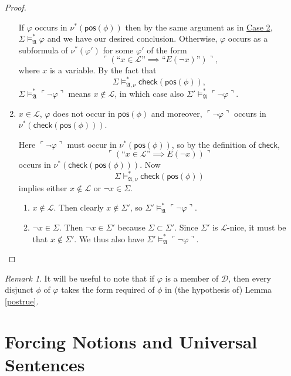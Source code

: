 \documentclass[12pt, twoside]{memoir}
\numberwithin{equation}{section}
\theoremstyle{definition}
\theoremstyle{remark}
\newtheorem{rem}[thm]{Remark}
\theoremstyle{definition}
\theoremstyle{definition}
\theoremstyle{definition}
\theoremstyle{remark}
\begin{document}
\begin{proof}
\begin{enumerate}[label=Case \arabic*:, leftmargin=50pt]
    If $\varphi$ occurs in $\nu^*(\mathsf{pos}(\phi))$ then by the same argument as in \hyperref[5136c2]{Case 2}, $\Sigma \models^*_{\mathfrak{A}} \varphi$ and we have our desired conclusion. Otherwise, $\varphi$ occurs as a subformula of $\nu^*(\varphi')$ for some $\varphi'$ of the form $$\ulcorner (\text{``} x \in \mathcal{L} \text{''} \implies \text{``} E(\neg x) \text{''}) \urcorner \text{,}$$ where $x$ is a variable. By the fact that $$\Sigma \models^*_{\mathfrak{A}, \nu} \mathsf{check}(\mathsf{pos}(\phi)),$$ $\Sigma \models^*_{\mathfrak{A}} \ulcorner \neg \varphi \urcorner$ means $x \not \in \mathcal{L}$, in which case also $\Sigma' \models^*_{\mathfrak{A}} \ulcorner \neg \varphi \urcorner$.
    \item $x \in \mathcal{L}$, $\varphi$ does not occur in $\mathsf{pos}(\phi)$ and moreover, $\ulcorner \neg \varphi \urcorner$ occurs in \\ $\nu^*(\mathsf{check}(\mathsf{pos}(\phi)))$. 
    
    Here $\ulcorner \neg \varphi \urcorner$ must occur in $\nu^*(\mathsf{pos}(\phi))$, so by the definition of $\mathsf{check}$, $$\ulcorner (\text{``} x \in \mathcal{L} \text{''} \implies E(\neg x)) \urcorner$$ occurs in $\nu^*(\mathsf{check}(\mathsf{pos}(\phi)))$. Now $$\Sigma \models^*_{\mathfrak{A}, \nu} \mathsf{check}(\mathsf{pos}(\phi))$$ implies either $x \not \in \mathcal{L}$ or $\neg x \in \Sigma$. 
    \begin{enumerate}[label=Subcase \arabic*:, leftmargin=60pt]
        \item $x \not \in \mathcal{L}$. Then clearly $x \not \in \Sigma'$, so $\Sigma' \models^*_{\mathfrak{A}} \ulcorner \neg \varphi \urcorner$.
        \item $\neg x \in \Sigma$. Then $\neg x \in \Sigma'$ because $\Sigma \subset \Sigma'$. Since $\Sigma'$ is $\mathcal{L}$-nice, it must be that $x \not \in \Sigma'$. We thus also have $\Sigma' \models^*_{\mathfrak{A}} \ulcorner \neg \varphi \urcorner$. \qedhere
    \end{enumerate}
\end{enumerate}
\end{proof}

\begin{rem}\label{rem328}
It will be useful to note that if $\varphi$ is a member of $\mathcal{D}$, then every disjunct $\phi$ of $\varphi$ takes the form required of $\phi$ in (the hypothesis of) Lemma \ref{postrue}.
\end{rem}

\section{Forcing Notions and Universal Sentences}
\end{document}
